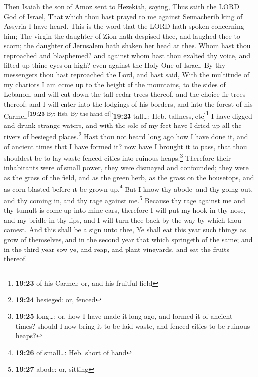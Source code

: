  Then Isaiah the son of Amoz sent to Hezekiah, saying,
Thus saith the LORD God of Israel, That which thou hast prayed to me
against Sennacherib king of Assyria I have heard.  This
is the word that the LORD hath spoken concerning him; The virgin the
daughter of Zion hath despised thee, and laughed thee to scorn; the
daughter of Jerusalem hath shaken her head at thee.  Whom
hast thou reproached and blasphemed? and against whom hast thou exalted
thy voice, and lifted up thine eyes on high? even against the Holy One
of Israel.  By thy messengers thou hast reproached the
Lord, and hast said, With the multitude of my chariots I am come up to
the height of the mountains, to the sides of Lebanon, and will cut down
the tall cedar trees thereof, and the choice fir trees thereof: and I
will enter into the lodgings of his borders, and into the forest of his
Carmel.\textsuperscript{{[}\textbf{19:23} By: Heb. By the hand
of{]}}{[}\textbf{19:23} tall\ldots: Heb. tallness, etc{]}\footnote{\textbf{19:23}
  of his Carmel: or, and his fruitful field}  I have
digged and drunk strange waters, and with the sole of my feet have I
dried up all the rivers of besieged places.\footnote{\textbf{19:24}
  besieged: or, fenced}  Hast thou not heard long ago how
I have done it, and of ancient times that I have formed it? now have I
brought it to pass, that thou shouldest be to lay waste fenced cities
into ruinous heaps.\footnote{\textbf{19:25} long\ldots: or, how I have
  made it long ago, and formed it of ancient times? should I now bring
  it to be laid waste, and fenced cities to be ruinous heaps?}
 Therefore their inhabitants were of small power, they
were dismayed and confounded; they were as the grass of the field, and
as the green herb, as the grass on the housetops, and as corn blasted
before it be grown up.\footnote{\textbf{19:26} of small\ldots: Heb.
  short of hand}  But I know thy abode, and thy going
out, and thy coming in, and thy rage against me.\footnote{\textbf{19:27}
  abode: or, sitting}  Because thy rage against me and
thy tumult is come up into mine ears, therefore I will put my hook in
thy nose, and my bridle in thy lips, and I will turn thee back by the
way by which thou camest.  And this shall be a sign unto
thee, Ye shall eat this year such things as grow of themselves, and in
the second year that which springeth of the same; and in the third year
sow ye, and reap, and plant vineyards, and eat the fruits thereof.

